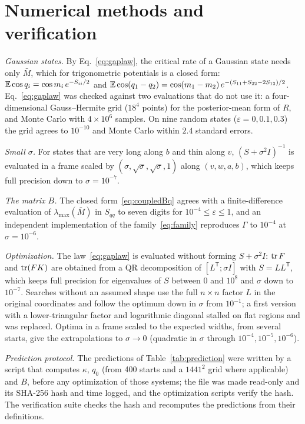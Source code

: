 \section{Numerical methods and verification}
\label{app:methods}

\emph{Gaussian states.} By Eq.~\eqref{eq:gaplaw}, the critical rate of a Gaussian state needs only $\bar M$, which for trigonometric potentials is a closed form: $\mathbb{E}\cos q_i = \cos m_i\,e^{-S_{ii}/2}$ and $\mathbb{E}\cos(q_1-q_2) = \cos(m_1-m_2)\,e^{-(S_{11}+S_{22}-2S_{12})/2}$. Eq.~\eqref{eq:gaplaw} was checked against two evaluations that do not use it: a four-dimensional Gauss--Hermite grid ($18^4$ points) for the posterior-mean form of $R$, and Monte Carlo with $4\times10^6$ samples. On nine random states ($\varepsilon = 0, 0.1, 0.3$) the grid agrees to $10^{-10}$ and Monte Carlo within $2.4$ standard errors.

\emph{Small $\sigma$.} For states that are very long along $b$ and thin along $v$, $(S + \sigma^2 I)^{-1}$ is evaluated in a frame scaled by $(\sigma, \sqrt\sigma, \sqrt\sigma, 1)$ along $(v, w, a, b)$, which keeps full precision down to $\sigma = 10^{-7}$.

\emph{The matrix $B$.} The closed form~\eqref{eq:coupledBq} agrees with a finite-difference evaluation of $\lambda_{\max}(\bar M)$ in $S_{qq}$ to seven digits for $10^{-4} \leq \varepsilon \leq 1$, and an independent implementation of the family~\eqref{eq:family} reproduces $\Gamma$ to $10^{-4}$ at $\sigma = 10^{-6}$.

\emph{Optimization.} The law~\eqref{eq:gaplaw} is evaluated without forming $S + \sigma^2 I$: $\operatorname{tr} F$ and $\operatorname{tr}(FK)$ are obtained from a QR decomposition of $[L^{\mathsf T}; \sigma I]$ with $S = LL^{\mathsf T}$, which keeps full precision for eigenvalues of $S$ between $0$ and $10^8$ and $\sigma$ down to $10^{-7}$. Searches without an assumed shape use the full $n\times n$ factor $L$ in the original coordinates and follow the optimum down in $\sigma$ from $10^{-1}$; a first version with a lower-triangular factor and logarithmic diagonal stalled on flat regions and was replaced. Optima in a frame scaled to the expected widths, from several starts, give the extrapolations to $\sigma\to0$ (quadratic in $\sigma$ through $10^{-4}, 10^{-5}, 10^{-6}$).

\emph{Prediction protocol.} The predictions of Table~\ref{tab:prediction} were written by a script that computes $\kappa$, $q_0$ (from 400 starts and a $1441^2$ grid where applicable) and $B$, before any optimization of those systems; the file was made read-only and its SHA-256 hash and time logged, and the optimization scripts verify the hash. The verification suite checks the hash and recomputes the predictions from their definitions.

